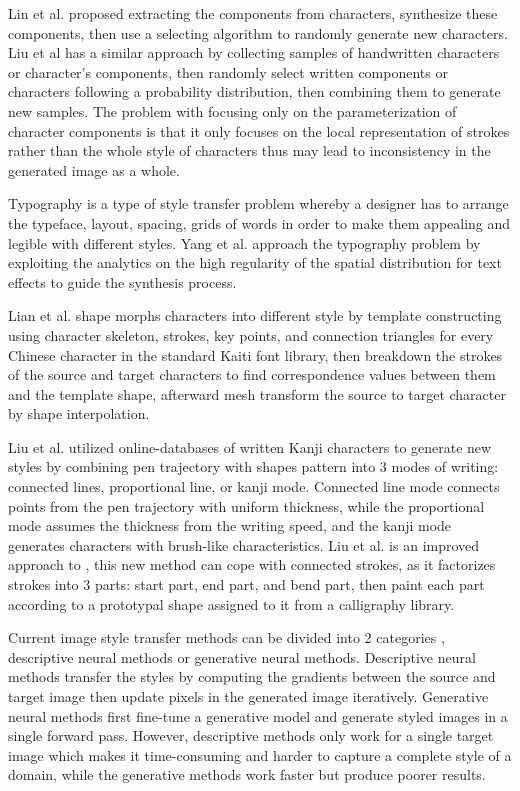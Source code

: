 \documentclass[12pt]{report}
\begin{document}
Lin et al.\cite{handwritten-font} proposed extracting the components from characters, synthesize these components, then use a selecting algorithm to randomly generate new characters. Liu et al\cite{automatic-personalized} has a similar approach by collecting samples of handwritten characters or character’s components, then randomly select written components or characters
following a probability distribution, then combining them to generate new samples. The problem with focusing only on the parameterization of character components is that it only focuses on the local representation of strokes rather than the whole
style of characters thus may lead to inconsistency in the generated image as a whole.

Typography is a type of style transfer problem whereby a designer has to arrange the typeface, layout, spacing, grids of words in order to make them appealing and legible with different styles. Yang et al.\cite{awesome-typography} approach the typography problem by exploiting the analytics on the high regularity of the spatial distribution for text effects to guide the synthesis process. 

Lian et al.\cite{automatic-morphing} shape morphs characters into different style by template constructing using character skeleton, strokes, key points, and connection triangles for every Chinese character in the standard Kaiti font library, then breakdown the strokes of the source and target characters to find correspondence values between them and the template shape, afterward mesh transform the source to target character by shape interpolation.

Liu et al.\cite{online-kanji} utilized online-databases of written Kanji characters to generate new styles by combining pen trajectory with shapes pattern into 3 modes of writing: connected lines, proportional line, or kanji mode. Connected line mode connects points from the pen trajectory with uniform thickness, while the proportional mode assumes the thickness from the writing speed, and the kanji mode generates characters with brush-like characteristics. Liu et al.\cite{online-kanji-2} is an improved approach to \cite{online-kanji}, this new method can cope with connected strokes, as it factorizes strokes into 3 parts: start part, end part, and bend part, then paint each part according to a prototypal shape assigned to it from a calligraphy library.

Current image style transfer methods can be divided into 2 categories \cite{neural-style}, descriptive neural methods or generative neural methods. Descriptive neural methods transfer the styles by computing the gradients between the source and target image then update pixels in the generated image iteratively. Generative neural methods first fine-tune a generative model and generate styled images in a single forward pass. However, descriptive methods only work for a single target image which makes it time-consuming and harder to capture a complete style of a domain, while the generative methods work faster but produce poorer results.
\end{document}
